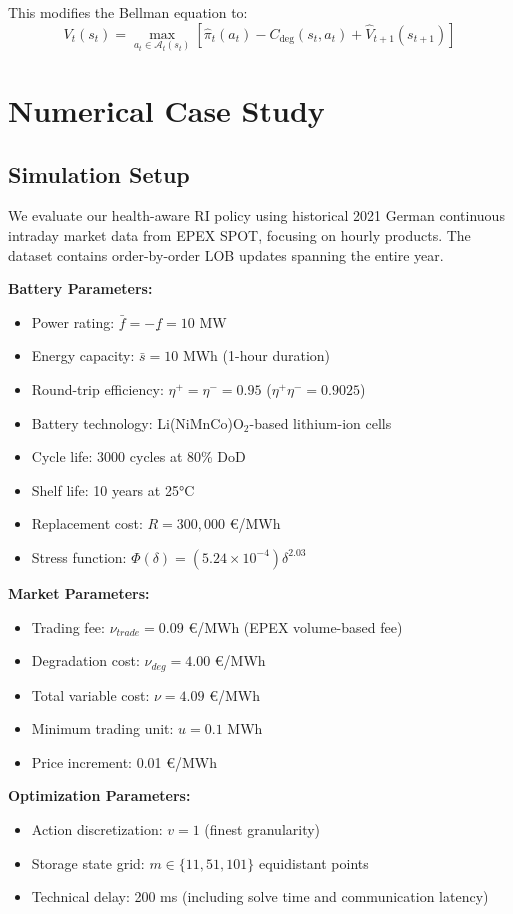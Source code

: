 \documentclass[10pt,twocolumn]{article}
\begin{document}
This modifies the Bellman equation to:
\[
V_t(s_t) = \max_{a_t \in \mathcal{A}_t(s_t)} \left[ \hat{\pi}_t(a_t) - C_{\text{deg}}(s_t, a_t) + \hat{V}_{t+1}(s_{t+1}) \right]
\]

\section{Numerical Case Study}
\subsection{Simulation Setup}
We evaluate our health-aware RI policy using historical 2021 German continuous intraday market data from EPEX SPOT, focusing on hourly products. The dataset contains order-by-order LOB updates spanning the entire year.

\textbf{Battery Parameters:}
\begin{itemize}
\item Power rating: $\bar{f} = -\underline{f} = 10$ MW
\item Energy capacity: $\bar{s} = 10$ MWh (1-hour duration)
\item Round-trip efficiency: $\eta^+ = \eta^- = 0.95$ ($\eta^+ \eta^- = 0.9025$)
\item Battery technology: Li(NiMnCo)O$_2$-based lithium-ion cells
\item Cycle life: 3000 cycles at 80\% DoD
\item Shelf life: 10 years at 25°C
\item Replacement cost: $R = 300,000$ €/MWh
\item Stress function: $\Phi(\delta) = (5.24 \times 10^{-4})\delta^{2.03}$
\end{itemize}

\textbf{Market Parameters:}
\begin{itemize}
\item Trading fee: $\nu_{trade} = 0.09$ €/MWh (EPEX volume-based fee)
\item Degradation cost: $\nu_{deg} = 4.00$ €/MWh
\item Total variable cost: $\nu = 4.09$ €/MWh
\item Minimum trading unit: $u = 0.1$ MWh
\item Price increment: 0.01 €/MWh
\end{itemize}

\textbf{Optimization Parameters:}
\begin{itemize}
\item Action discretization: $v = 1$ (finest granularity)
\item Storage state grid: $m \in \{11, 51, 101\}$ equidistant points
\item Technical delay: 200 ms (including solve time and communication latency)
\end{itemize}
\end{document}
